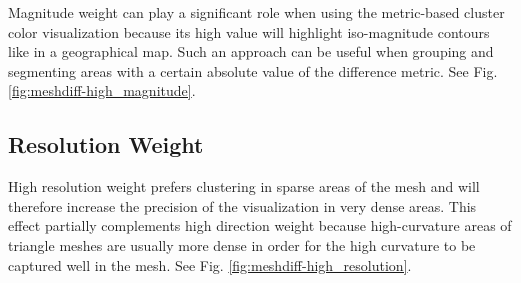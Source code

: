 Magnitude weight can play a significant role when using the metric-based cluster color visualization because its high value will highlight iso-magnitude contours like in a geographical map. Such an approach can be useful when grouping and segmenting areas with a certain absolute value of the difference metric. See Fig. \ref{fig:meshdiff-high_magnitude}.
\subsection{Resolution Weight}
\label{subsec:analysis-parameter_effect-resolution}

High resolution weight prefers clustering in sparse areas of the mesh and will therefore increase the precision of the visualization in very dense areas. This effect partially complements high direction weight because high-curvature areas of triangle meshes are usually more dense in order for the high curvature to be captured well in the mesh. See Fig. \ref{fig:meshdiff-high_resolution}.

